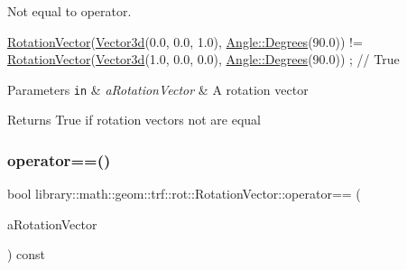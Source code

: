 Not equal to operator. 


\begin{DoxyCode}
\hyperlink{classlibrary_1_1math_1_1geom_1_1trf_1_1rot_1_1_rotation_vector_a32b1fab5e81bc24d777324daf5849205}{RotationVector}(\hyperlink{namespacelibrary_1_1math_1_1obj_a977e84e9bf317a4e7dd9d6d671d6da2f}{Vector3d}(0.0, 0.0, 1.0), \hyperlink{classlibrary_1_1math_1_1geom_1_1_angle_a64aa53e8420aeb6f671d86c65c370bc8}{Angle::Degrees}(90.0)) != 
      \hyperlink{classlibrary_1_1math_1_1geom_1_1trf_1_1rot_1_1_rotation_vector_a32b1fab5e81bc24d777324daf5849205}{RotationVector}(\hyperlink{namespacelibrary_1_1math_1_1obj_a977e84e9bf317a4e7dd9d6d671d6da2f}{Vector3d}(1.0, 0.0, 0.0), \hyperlink{classlibrary_1_1math_1_1geom_1_1_angle_a64aa53e8420aeb6f671d86c65c370bc8}{Angle::Degrees}(90.0)) ; \textcolor{comment}{// True}
\end{DoxyCode}



\begin{DoxyParams}[1]{Parameters}
\mbox{\tt in}  & {\em a\+Rotation\+Vector} & A rotation vector \\
\hline
\end{DoxyParams}
\begin{DoxyReturn}{Returns}
True if rotation vectors not are equal 
\end{DoxyReturn}
\mbox{\label{classlibrary_1_1math_1_1geom_1_1trf_1_1rot_1_1_rotation_vector_abccc9155d16c64e0e079d64419f489bf}} 
\subsubsection{\texorpdfstring{operator==()}{operator==()}}
{\footnotesize\ttfamily bool library\+::math\+::geom\+::trf\+::rot\+::\+Rotation\+Vector\+::operator== (\begin{DoxyParamCaption}\item[{const \hyperlink{classlibrary_1_1math_1_1geom_1_1trf_1_1rot_1_1_rotation_vector}{Rotation\+Vector} \&}]{a\+Rotation\+Vector }\end{DoxyParamCaption}) const}



